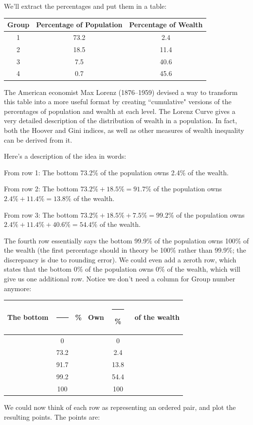 \documentclass[12pt]{memoir}\usepackage[]{graphicx}\usepackage[table]{xcolor}
\begin{document}
We'll extract the percentages and put them in a table: 
\begin{center}
\begin{tabular}{ccc}
\toprule
Group & Percentage of Population & Percentage of Wealth \\ \midrule
1     & 73.2                     &  2.4 \\ \midrule
2     & 18.5                     & 11.4 \\ \midrule
3     &  7.5                     & 40.6 \\ \midrule 
4     &  0.7                     & 45.6 \\ \bottomrule
\end{tabular}
\end{center}
The American economist Max Lorenz (1876--1959) devised a way to transform this 
table into a more useful format by creating ``cumulative" versions of the
percentages of population and wealth at each level.  The Lorenz Curve gives a 
very detailed description of the distribution of wealth in a population.  In fact,
both the Hoover and Gini indices, as well as other measures of wealth inequality
can be derived from it.

Here's a description of the idea in words: 

From row 1:  The bottom 73.2\% of the population owns 2.4\% of the wealth.

From row 2:  The bottom $73.2\% + 18.5\% = 91.7\%$ of the population owns $2.4\% + 11.4\% = 13.8\%$
of the wealth.


From row 3:  The bottom $73.2\% + 18.5\% + 7.5\% = 99.2\%$ of the population owns
$2.4\% + 11.4\% + 40.6\% = 54.4\%$ of the wealth.

The fourth row essentially says the bottom 99.9\% of the population owns 100\% of 
the wealth (the first percentage should in theory be 100\% rather than 99.9\%; the discrepancy is due 
to rounding error).  We could even add a zeroth row, which states that the bottom 0\% of the population owns
0\% of the wealth, which will give us one additional row.  Notice we don't need 
a column for Group number anymore:
\begin{center}
\begin{tabular}{ccccc}
\toprule
The bottom\, & \rule{1cm}{0.4pt} & \%  \,  Own\, & \rule{1cm}{0.4pt}\% & \, of the wealth \\ \midrule
& 0 &    & 0 & \\ \midrule
& 73.2 & & 2.4 & \\ \midrule
& 91.7 & & 13.8 & \\ \midrule
& 99.2 & & 54.4 & \\ \midrule
& 100 &  & 100 & \\ \bottomrule
\end{tabular}
\end{center}
We could now think of each row as representing an ordered pair, and plot
the resulting points.  The points are:
\end{document}
